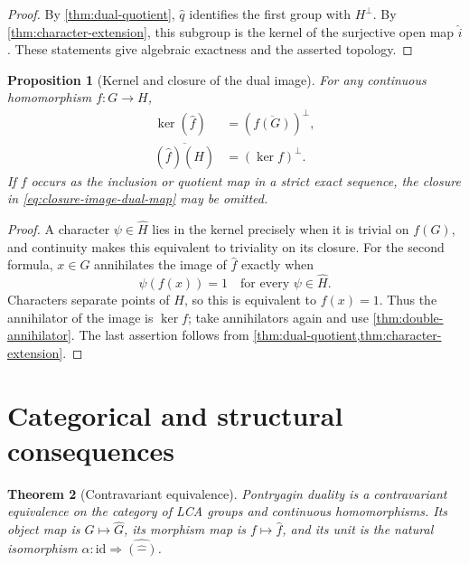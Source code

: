 \documentclass[11pt]{article}
\newtheorem{theorem}{Theorem}[section]
\newtheorem{proposition}[theorem]{Proposition}
\theoremstyle{definition}
\theoremstyle{remark}
\newcommand{\id}{\mathrm{id}}
\newcommand{\dual}[1]{\widehat{#1}}
\begin{document}
\begin{proof}
By \cref{thm:dual-quotient}, $\dual q$ identifies the first group with $H^\perp$.
By \cref{thm:character-extension}, this subgroup is the kernel of the surjective open map
$\dual i$.  These statements give algebraic exactness and the asserted topology.
\end{proof}

\begin{proposition}[Kernel and closure of the dual image]
\label{prop:dual-kernel-image}
For any continuous homomorphism $f:G\to H$,
\begin{align}
 \ker(\dual f)&=(\overline{f(G)})^\perp,
 \label{eq:kernel-dual-map}\\
 \overline{(\dual f)(\dual H)}&=(\ker f)^\perp.
 \label{eq:closure-image-dual-map}
\end{align}
If $f$ occurs as the inclusion or quotient map in a strict exact sequence, the closure in
\eqref{eq:closure-image-dual-map} may be omitted.
\end{proposition}

\begin{proof}
A character $\psi\in\dual H$ lies in the kernel precisely when it is trivial on $f(G)$,
and continuity makes this equivalent to triviality on its closure.  For the second
formula, $x\in G$ annihilates the image of $\dual f$ exactly when
\[
  \psi(f(x))=1\quad\text{for every }\psi\in\dual H.
\]
Characters separate points of $H$, so this is equivalent to $f(x)=1$.  Thus the
annihilator of the image is $\ker f$; take annihilators again and use
\cref{thm:double-annihilator}.  The last assertion follows from
\cref{thm:dual-quotient,thm:character-extension}.
\end{proof}

\section{Categorical and structural consequences}
\label{sec:categorical}

\begin{theorem}[Contravariant equivalence]
\label{thm:anti-equivalence}
Pontryagin duality is a contravariant equivalence on the category of LCA groups and
continuous homomorphisms.  Its object map is $G\mapsto\dual G$, its morphism map is
$f\mapsto\dual f$, and its unit is the natural isomorphism $\alpha:\id\Rightarrow\dual{(
\dual{\mathord{-}})}$.
\end{theorem}
\end{document}
